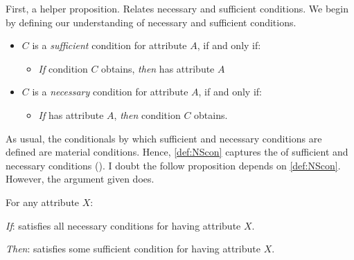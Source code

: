 \begin{note}
  First, a helper proposition.
  Relates necessary and sufficient conditions.
  We begin by defining our understanding of necessary and sufficient conditions.

  \begin{definition}
    \label{def:NScon}
    \vspace{-\baselineskip}
    \begin{itemize}
    \item
      \(C\) is a \emph{sufficient} condition for attribute \(A\), if and only if:
      \begin{itemize}
      \item
        \emph{If} condition \(C\) obtains, \emph{then} \vAgent{} has attribute \(A\)
      \end{itemize}
    \item
      \(C\) is a \emph{necessary} condition for attribute \(A\), if and only if:
      \begin{itemize}
      \item
        \emph{If} \vAgent{} has attribute \(A\), \emph{then} condition \(C\) obtains.
      \end{itemize}
    \end{itemize}
    \vspace{-\baselineskip}
  \end{definition}

  \noindent%
  As usual, the conditionals by which sufficient and necessary conditions are defined are material conditions.
  Hence, \autoref{def:NScon} captures the  of sufficient and necessary conditions
  (\cite[cf.][\S2]{Brennan:2022aa}).
  I doubt the follow proposition depends on \autoref{def:NScon}.
  However, the argument given does.

  \begin{proposition}[Attribution]
    \label{prop:attribution}
    For any attribute \(X\):
    \begin{itenum}
    \item[\emph{If}:]
      \vAgent{} satisfies all necessary conditions for having attribute \(X\).
    \item[\emph{Then}:]
      \vAgent{} satisfies some sufficient condition for having attribute \(X\).
    \end{itenum}
    \vspace{-\baselineskip}
  \end{proposition}


\end{note}
